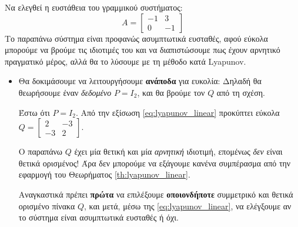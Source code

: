 \documentclass[11pt,a4paper,notitlepage,fleqn]{article}
\begin{document}
\begin{exercise}[Παράδειγμα]
	Να ελεγθεί η ευστάθεια του γραμμικού συστήματος:
	\[
	A = \left[
	\begin{matrix}
	-1 & 3 \\ 0 & -1
	\end{matrix}\right]
	\]
	\tcblower
	Το παραπάνω σύστημα είναι προφανώς ασυμπτωτικά ευσταθές,
	αφού εύκολα μπορούμε να βρούμε τις ιδιοτιμές του και να διαπιστώσουμε πως έχουν
	αρνητικό πραγματικό μέρος,
    αλλά θα το λύσουμε με τη μέθοδο κατά Lyapunov.
    
    \begin{itemize}
    \item	Θα δοκιμάσουμε να λειτουργήσουμε \textbf{ανάποδα} για ευκολία:
    	Δηλαδή θα θεωρήσουμε έναν \textit{δεδομένο} \( P=I_2 \), και
    	θα βρούμε τον \( Q \) από τη σχέση.
    	
    	Έστω ότι \( P = I_2 \). Από την εξίσωση \eqref{eq:lyapunov_linear}
    	προκύπτει εύκολα \( Q = \left[\begin{matrix}
    	2 & -3 \\ -3 & 2
    	\end{matrix}\right] \).
    	
    	Ο παραπάνω \( Q \) έχει μία θετική και μία \textit{αρνητική}
    	ιδιοτιμή, επομένως \textit{δεν} είναι θετικά ορισμένος! Άρα
    	δεν μπορούμε να εξάγουμε κανένα συμπέρασμα από την εφαρμογή
    	του Θεωρήματος \ref{th:lyapunov_linear}.
    	
    	Αναγκαστικά πρέπει \textbf{πρώτα} να επιλέξουμε \textbf{οποιονδήποτε} συμμετρικό και θετικά ορισμένο πίνακα
    	\( Q \), και μετά, μέσω της \eqref{eq:lyapunov_linear}, να
    	ελέγξουμε αν το σύστημα είναι ασυμπτωτικά ευσταθές ή όχι.
    \end{itemize}
\end{exercise}
\end{document}
